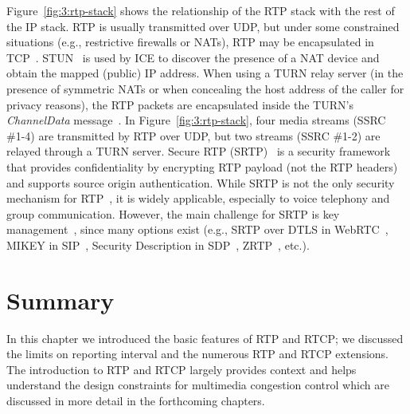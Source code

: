 Figure~\ref{fig:3:rtp-stack} shows the relationship of the RTP stack with the
rest of the IP stack. RTP is usually transmitted over UDP, but under some
constrained situations (e.g., restrictive firewalls or NATs), RTP may be
encapsulated in TCP~\cite{rfc3550}. STUN~\cite{rfc5389} is used by ICE to
discover the presence of a NAT device and obtain the mapped (public) IP
address. When using a TURN relay server (in the presence of symmetric NATs or
when concealing the host address of the caller for privacy reasons), the RTP
packets are encapsulated inside the TURN's \emph{ChannelData}
message~\cite{rfc5766}. In Figure~\ref{fig:3:rtp-stack}, four media streams
(SSRC \#1-4) are transmitted by RTP over UDP, but two streams (SSRC \#1-2) are
relayed through a TURN server. Secure RTP (SRTP)~\cite{rfc3611} is a security
framework that provides confidentiality by encrypting RTP payload (not the RTP
headers) and supports source origin authentication. While SRTP is not the only
security mechanism for RTP~\cite{rfc7202}, it is widely
applicable, especially to voice telephony and group communication. However,
the main challenge for SRTP is key management~\cite{rfc7201}, since
many options exist (e.g., SRTP over DTLS in WebRTC~\cite{rfc5763}, MIKEY in
SIP~\cite{rfc3830}, Security Description in SDP~\cite{rfc4566},
ZRTP~\cite{rfc6189}, etc.).

\section{Summary}

In this chapter we introduced the basic features of RTP and RTCP; we discussed
the limits on reporting interval and the numerous RTP and RTCP extensions.
The introduction to RTP and RTCP largely provides context and helps understand
the design constraints  for multimedia congestion control which are discussed
in more detail in the forthcoming chapters.
